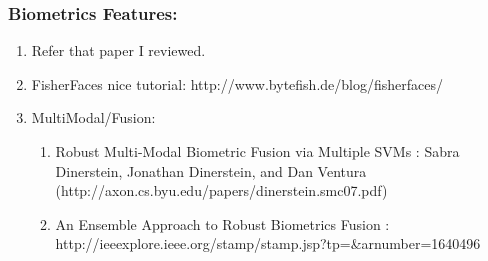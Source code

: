 \documentclass[11pt]{article}
\begin{document}
\subsubsection*{Biometrics Features:}
\begin{enumerate}
 \item Refer that paper I reviewed.
 \item FisherFaces nice tutorial: http://www.bytefish.de/blog/fisherfaces/
 \item MultiModal/Fusion:
 \begin{enumerate}
  \item Robust Multi-Modal Biometric Fusion via Multiple SVMs : Sabra Dinerstein, Jonathan Dinerstein, and Dan Ventura 
(http://axon.cs.byu.edu/papers/dinerstein.smc07.pdf)
 \item An Ensemble Approach to Robust Biometrics Fusion : http://ieeexplore.ieee.org/stamp/stamp.jsp?tp=\&arnumber=1640496
 \end{enumerate}

\end{enumerate}
  
\end{document}
